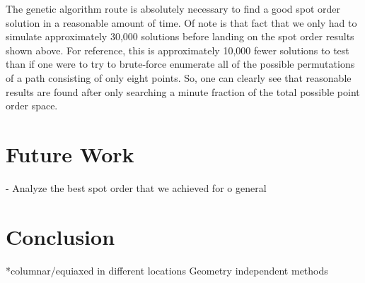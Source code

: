 \documentclass[a4paper]{article}
\begin{document}
The genetic algorithm route is absolutely necessary to find a good spot order solution in a reasonable amount of time. Of note is that fact that we only had to simulate approximately 30,000 solutions before landing on the spot order results shown above. For reference, this is approximately 10,000 fewer solutions to test than if one were to try to brute-force enumerate all of the possible permutations of a path consisting of only eight points. So, one can clearly see that reasonable results are found after only searching a minute fraction of the total possible point order space. 


\section{Future Work}
\label{sec:futurework}

-	Analyze the best spot order that we achieved for
o	general


\section{Conclusion}
\label{sec:conclusion}

*columnar/equiaxed in different locations
Geometry independent methods






\end{document}
